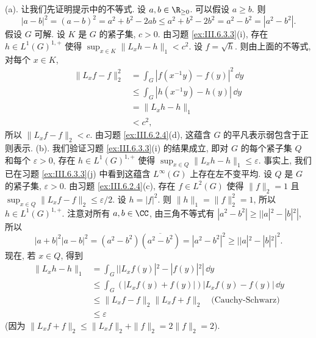 \begin{solution}
(a). 让我们先证明提示中的不等式. 设 $a, b \in \R_{\geq 0}$. 可以假设 $a \geq b$. 则
\[
|a - b|^2 = (a - b)^2 = a^2 + b^2 - 2ab \leq a^2 + b^2 - 2b^2 = a^2 - b^2 = |a^2 - b^2|.
\]
假设 $G$ 可解. 设 $K$ 是 $G$ 的紧子集, $c > 0$. 由习题 \ref{ex:III.6.3.3}(i), 存在 $h \in L^1(G)^{1,+}$ 使得 $\sup_{x \in K}\|L_xh - h\|_1 < c^2$. 设 $f = \sqrt{h}$. 则由上面的不等式, 对每个 $x \in K$,
\begin{align*}
\|L_xf - f\|_2^2 &= \int_G |f(x^{-1}y) - f(y)|^2\,\dd y \\
&\leq \int_G |h(x^{-1}y) - h(y)|\,\dd y \\
&= \|L_xh - h\|_1 \\
&< c^2,
\end{align*}
所以 $\|L_xf - f\|_2 < c$.
由习题 \ref{ex:III.6.2.4}(d), 这蕴含 $G$ 的平凡表示弱包含于正则表示.
(b). 我们验证习题 \ref{ex:III.6.3.3}(i) 的结果成立, 即对 $G$ 的每个紧子集 $Q$ 和每个 $\varepsilon > 0$, 存在 $h \in L^1(G)^{1,+}$ 使得 $\sup_{x \in Q}\|L_xh - h\|_1 \leq \varepsilon$. 事实上, 我们已在习题 \ref{ex:III.6.3.3}(j) 中看到这蕴含 $L^{\infty}(G)$ 上存在左不变平均.
设 $Q$ 是 $G$ 的紧子集, $\varepsilon > 0$. 由习题 \ref{ex:III.6.2.4}(c), 存在 $f \in L^2(G)$ 使得 $\|f\|_2 = 1$ 且 $\sup_{x \in Q}\|L_xf - f\|_2 \leq \varepsilon/2$. 设 $h = |f|^2$. 则 $\|h\|_1 = \|f\|_2^2 = 1$, 所以 $h \in L^1(G)^{1,+}$. 注意对所有 $a, b \in \CC$, 由三角不等式有 $|a^2 - b^2| \geq ||a|^2 - |b|^2|$, 所以
\[
|a + b|^2|a - b|^2 = (a^2 - b^2)(\overline{a^2 - b^2}) = |a^2 - b^2|^2 \geq ||a|^2 - |b|^2|^2.
\]
现在, 若 $x \in Q$, 得到
\begin{align*}
\|L_xh - h\|_1 &= \int_G ||L_xf(y)|^2 - |f(y)|^2|\,\dd y \\
&\leq \int_G (|L_xf(y) + f(y)|)|L_xf(y) - f(y)|\,\dd y \\
&\leq \|L_xf - f\|_2\|L_xf + f\|_2 \quad \text{(Cauchy-Schwarz)} \\
&\leq \varepsilon
\end{align*}
(因为 $\|L_xf + f\|_2 \leq \|L_xf\|_2 + \|f\|_2 = 2\|f\|_2 = 2$).
\end{solution}

